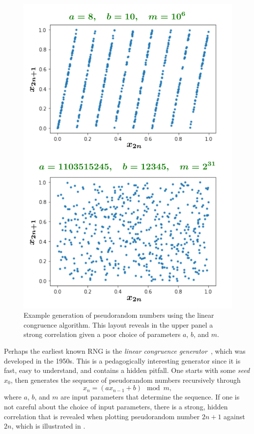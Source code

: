 \begin{figure}
  \centering
  \includegraphics[width=\linewidth]{figs/linear_congruence.pdf} 
  \caption{Example generation of pseudorandom numbers using the linear
           congruence algorithm. This layout reveals in the upper panel
           a strong correlation given a poor choice of parameters
           $a$, $b$, and $m$.}
  \label{fig:RNG} 
\end{figure} 


Perhaps the earliest known RNG is the {\it linear congruence 
generator}~\cite{lehmer_mathematical_1951,thomson_modified_1958},
which was developed in the 1950s.
This is a pedagogically interesting generator since it is fast,
easy to understand, and contains a hidden pitfall. 
One starts with some {\it seed}
$x_0$, then generates the sequence of pseudorandom numbers
recursively through
\begin{equation}
x_n=(ax_{n-1}+b)\mod m,
\end{equation}
where $a$, $b$, and $m$ are input parameters that determine the
sequence. If one is not careful about the choice of input
parameters, there is a strong, hidden correlation that is revealed when plotting
pseudorandom number $2n+1$ against $2n$, which
is illustrated in .







